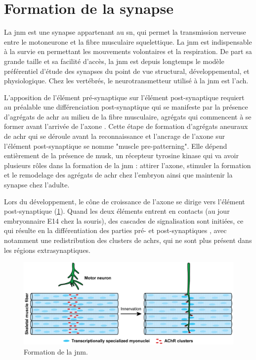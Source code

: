  
 
\section{Formation de la synapse}
\label{sec:IntroSynapse}
La \gls{jnm} est une synapse appartenant au \Acrfull{sn}, qui permet la transmission nerveuse entre le motoneurone et la fibre musculaire squelettique. La \gls{jnm} est indispensable à la survie en permettant les mouvements volontaires et la respiration. De part sa grande taille et sa facilité d'accès, la \gls{jnm} est depuis longtemps le modèle préférentiel d'étude des synapses du point de vue structural, développemental, et physiologique. Chez les vertébrés, le neurotransmetteur utilisé à la \gls{jnm} est l'\gls{ach}. 

L'apposition de l'élément pré-synaptique sur l'élément post-synaptique requiert au préalable une différenciation post-synaptique qui se manifeste par la présence d'agrégats de \gls{achr} au milieu de la fibre musculaire, agrégats qui commencent à se former avant l'arrivée de l'axone \cite{Wu2010a, Gordon2012}. Cette étape de formation d'agrégats aneuraux de \gls{achr} qui se déroule avant la reconnaissance et l'ancrage de l'axone sur l'élément post-synaptique se nomme "muscle pre-patterning". Elle dépend entièrement de la présence de \acrshort{musk}, un récepteur tyrosine kinase qui va avoir plusieurs rôles dans la formation de la \gls{jnm} : attirer l'axone, stimuler la formation et le remodelage des agrégats de \gls{achr} chez l'embryon ainsi que maintenir la synapse chez l'adulte.

Lors du développement, le cône de croissance de l'axone se dirige vers l'élément post-synaptique (\cref{fig:FormaJNM}). Quand les deux éléments entrent en contacts (au jour embryonnaire E14 chez la souris), des cascades de signalisation sont initiées, ce qui résulte en la différentiation des parties pré- et post-synaptiques \cite{Sanes1999}, avec notamment une redistribution des clusters de \glspl{achr}, qui ne sont plus présent dans les régions extrasynaptiques.

\begin{figure}[h]
	\includegraphics[width=\textwidth]{./Images/formation_jnm.png}
	\caption{Formation de la \gls{jnm}.} 
	\label{fig:FormaJNM}
\end{figure}

